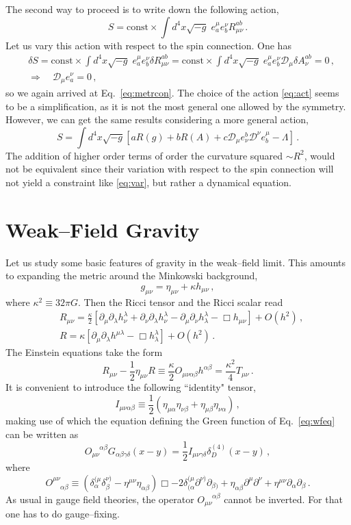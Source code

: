 \documentclass[12pt]{article}
\newcommand{\be}{\begin{equation}}
\newcommand{\ee}{\end{equation}}
\newcommand\m{\mu}
\newcommand\g{\gamma}
\newcommand\D{\Delta}
\newcommand\n{\nu}
\renewcommand\a{\alpha}
\renewcommand\b{\beta}
\renewcommand\l{\lambda}
\def\d{\partial}
\renewcommand{\D}{\mathcal{D}}
\begin{document}
The second way to proceed is to write down the following action,
\be
\label{eq:act}
S=\mathrm{const}\times \int d^4x \sqrt{-g}\; e_a^\m e_b^\n R_{\m \n}^{ab}\,.
\ee
Let us vary this action with respect to the spin connection. One has
\be
\label{eq:var}
\begin{split}
&\delta S=\mathrm{const}\times \int d^4x \sqrt{-g}\; e_a^\m e_b^\n\delta R_{\m \n}^{ab}=
\mathrm{const}\times \int d^4x \sqrt{-g}\; e_a^\m e_b^\n\D_{\m}\delta A_\nu^{ab}=0\,,\\
&\Rightarrow \quad
\D_{\m}e_a^\n =0\,,
\end{split}
\ee
so we again arrived at Eq.~\eqref{eq:metrcon}.
The choice of the action \eqref{eq:act} seems to be a simplification, as it is not the most general one allowed by the
symmetry. However, we can
get the same results considering a more general action,
\be
S=\int d^4 x\sqrt{-g} [aR(g)+bR(A)+c\D_\m e^{b}_\nu\D^\n e_{b}^{\m}-\Lambda]\,.
\ee
The addition of higher order terms of order the curvature squared $\sim R^2$, would not be equivalent since their variation with respect to the spin connection
will not yield a constraint like \eqref{eq:var}, but rather a dynamical equation.


\section{Weak--Field Gravity}
\label{sec:weak}

Let us study some basic features of gravity in the weak--field limit.
This amounts to expanding the metric around the Minkowski background,
\be
\label{eq:metrics}
g_{\m \n}=\eta_{\m \n}+\kappa h_{\m \nu} \,,
\ee
where $\kappa^2\equiv 32 \pi G$. Then the Ricci tensor and the Ricci scalar read
\be
\begin{split}
& R_{\m \n} =\frac{\kappa}{2}\left[\d_\m \d_\l h_\n^\l +\d_\n \d_\l h^\l_\n -\d_\m \d_\n h^\l_\l -\Box h_{\m \n}\right]+O(h^2)\,,\\
& R =\kappa\left[\d_\m \d_\l h^{\m\l} -\Box h^{\l}_{\l}\right]+O(h^2)\,.
\end{split}
\ee
The Einstein equations take the form
\be
\label{eq:wfeq}
R_{\m\n}-\frac{1}{2}\eta_{\m \n}R\equiv \frac{\kappa}{2}O_{\m\n\a\b}h^{\a \b} =\frac{\kappa^2}{4}T_{\m \n}\,.
\ee
It is convenient to introduce the following ``identity" tensor,
\be
I_{\m \n \a \b}\equiv \frac{1}{2}(\eta_{\m \a}\eta_{\n \b}+\eta_{\m \b}\eta_{\n \a})\,,
\ee
making use of which the equation defining the Green function of Eq.~\eqref{eq:wfeq}
can be written as
\be
\label{eq:green}
O_{\m \n}^{\; \; \; \; \a \b} G_{\a\b\g\delta}(x-y)=\frac{1}{2}I_{\m \n \g \delta}\delta^{(4)}_{D}(x-y)\,,
\ee
where
\be
 O^{\m \n}_{\; \; \; \; \a \b}\equiv (\delta^{(\m}_\a\delta^{\n)}_\b-\eta^{\m\n}\eta_{\a\b})\Box
 -2\delta^{(\m}_{(\a} \d^{\n)}\d_{\b)}+\eta_{\a \b}\d^\m\d^\n+\eta^{\m \n}\d_\a\d_\b\,.
\ee
As usual in gauge field theories, the operator $O_{\m \n}^{\; \; \; \; \a \b}$
cannot be inverted. For that one has to do gauge--fixing.
\end{document}
